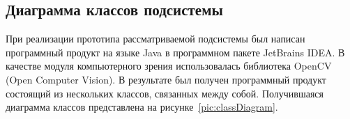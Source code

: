 

\subsection{Диаграмма классов подсистемы}
При реализации прототипа рассматриваемой подсистемы был написан программный продукт на  языке Java в программном пакете JetBrains IDEA. В качестве модуля компьютерного зрения использовалась библиотека OpenCV (Open Computer Vision). 
В результате был получен программный продукт состоящий из нескольких классов, связанных между собой. Получившаяся диаграмма классов представлена на рисунке~\ref{pic:classDiagram}.



